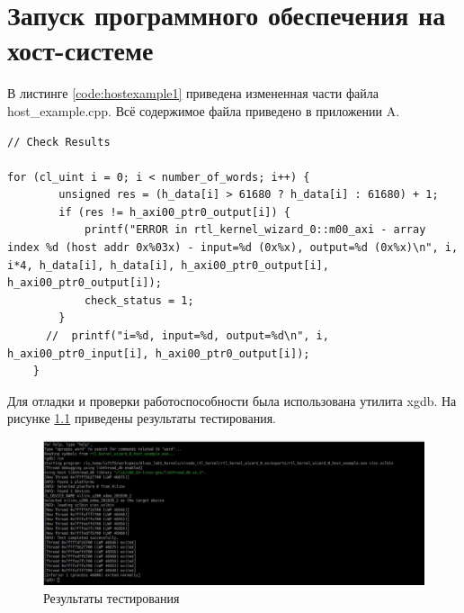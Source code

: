 \chapter{Запуск программного обеспечения на хост-системе}

В листинге \ref{code:hostexample1} приведена измененная части файла host\_example.cpp. Всё содержимое файла приведено в приложении A.

\begin{lstlisting}[label=code:hostexample1, caption=Модуль host\_example.cpp]
// Check Results

for (cl_uint i = 0; i < number_of_words; i++) {
        unsigned res = (h_data[i] > 61680 ? h_data[i] : 61680) + 1;
        if (res != h_axi00_ptr0_output[i]) {
            printf("ERROR in rtl_kernel_wizard_0::m00_axi - array index %d (host addr 0x%03x) - input=%d (0x%x), output=%d (0x%x)\n", i, i*4, h_data[i], h_data[i], h_axi00_ptr0_output[i], h_axi00_ptr0_output[i]);
            check_status = 1;
        }
      //  printf("i=%d, input=%d, output=%d\n", i,  h_axi00_ptr0_input[i], h_axi00_ptr0_output[i]);
    }
\end{lstlisting}

Для отладки и проверки работоспособности была использована утилита xgdb. На рисунке \ref{img:test} приведены результаты тестирования.

\begin{figure}[h!p]
	\centering
	\includegraphics[width = \linewidth]{inc/test.png}
	\caption{Результаты тестирования}
	\label{img:test}
\end{figure}

